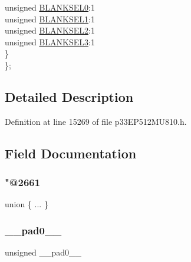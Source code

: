 \begin{DoxyCompactItemize}
\begin{tabbing}
\>\>unsigned \hyperlink{structtag_a_u_x_c_o_n5_b_i_t_s_ac11d96c4da7a19f8070237598aad5779}{BLANKSEL0}:1\\
\>\>unsigned \hyperlink{structtag_a_u_x_c_o_n5_b_i_t_s_a44677be7697055968c0df4a017937ad4}{BLANKSEL1}:1\\
\>\>unsigned \hyperlink{structtag_a_u_x_c_o_n5_b_i_t_s_aded93be63f6e5d719aa8cd84f125f650}{BLANKSEL2}:1\\
\>\>unsigned \hyperlink{structtag_a_u_x_c_o_n5_b_i_t_s_a9a435fdd957a6f0e1b6e67ea964df687}{BLANKSEL3}:1\\
\>\} \\
\}; \\

\end{tabbing}\end{DoxyCompactItemize}


\subsection{Detailed Description}


Definition at line 15269 of file p33\+E\+P512\+M\+U810.\+h.



\subsection{Field Documentation}
\mbox{\label{structtag_a_u_x_c_o_n5_b_i_t_s_a9eb13bdd946c16c88f7e684f233539d6}} 
\subsubsection{\texorpdfstring{"@2661}{@2661}}
{\footnotesize\ttfamily union \{ ... \} }

\mbox{\label{structtag_a_u_x_c_o_n5_b_i_t_s_adf71f3d8410c1f1dbbc96680a92c49af}} 
\subsubsection{\texorpdfstring{\+\_\+\+\_\+pad0\+\_\+\+\_\+}{\_\_pad0\_\_}}
{\footnotesize\ttfamily unsigned \+\_\+\+\_\+pad0\+\_\+\+\_\+}



